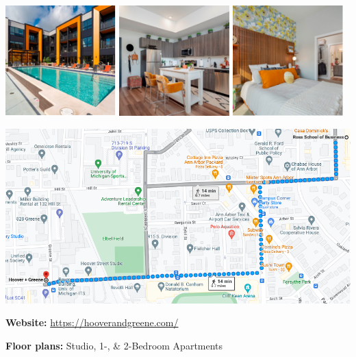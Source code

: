 \documentclass[
]{book}
\begin{document}
\includegraphics[width=0.32\textwidth,height=\textheight]{HG_exterior.png}
\includegraphics[width=0.32\textwidth,height=\textheight]{HG_interior1.png}
\includegraphics[width=0.32\textwidth,height=\textheight]{HG_interior2.png}

\begin{center}\includegraphics{HG_map} \end{center}

\textbf{Website:} \url{https://hooverandgreene.com/}

\textbf{Floor plans:} Studio, 1-, \& 2-Bedroom Apartments
\end{document}
